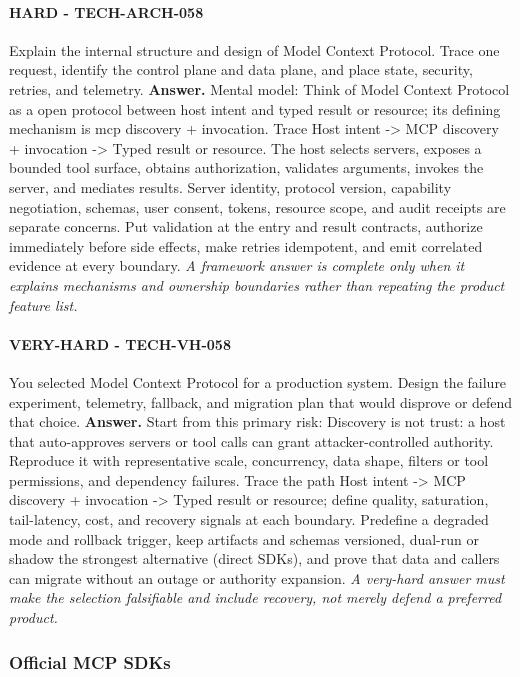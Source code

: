\paragraph{HARD - TECH-ARCH-058} Explain the internal structure and design of Model Context Protocol. Trace one request, identify the control plane and data plane, and place state, security, retries, and telemetry.
\textbf{Answer.} Mental model: Think of Model Context Protocol as a open protocol between host intent and typed result or resource; its defining mechanism is mcp discovery + invocation. Trace Host intent -> MCP discovery + invocation -> Typed result or resource. The host selects servers, exposes a bounded tool surface, obtains authorization, validates arguments, invokes the server, and mediates results. Server identity, protocol version, capability negotiation, schemas, user consent, tokens, resource scope, and audit receipts are separate concerns. Put validation at the entry and result contracts, authorize immediately before side effects, make retries idempotent, and emit correlated evidence at every boundary.
\textit{A framework answer is complete only when it explains mechanisms and ownership boundaries rather than repeating the product feature list.}
\paragraph{VERY-HARD - TECH-VH-058} You selected Model Context Protocol for a production system. Design the failure experiment, telemetry, fallback, and migration plan that would disprove or defend that choice.
\textbf{Answer.} Start from this primary risk: Discovery is not trust: a host that auto-approves servers or tool calls can grant attacker-controlled authority. Reproduce it with representative scale, concurrency, data shape, filters or tool permissions, and dependency failures. Trace the path Host intent -> MCP discovery + invocation -> Typed result or resource; define quality, saturation, tail-latency, cost, and recovery signals at each boundary. Predefine a degraded mode and rollback trigger, keep artifacts and schemas versioned, dual-run or shadow the strongest alternative (direct SDKs), and prove that data and callers can migrate without an outage or authority expansion.
\textit{A very-hard answer must make the selection falsifiable and include recovery, not merely defend a preferred product.}
\subsubsection*{Official MCP SDKs}
